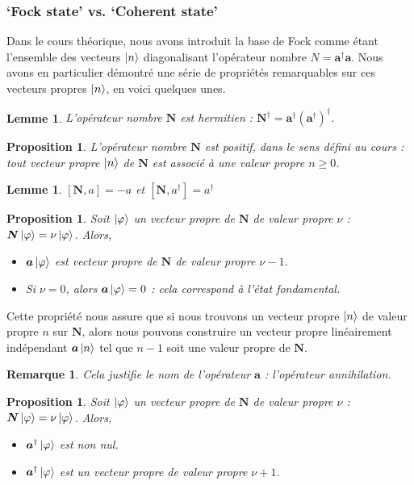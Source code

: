 \documentclass[11pt,oneside,a4paper]{article}
\newtheorem{lemma}[theorem]{Lemme}
\newtheorem{property}[theorem]{Proposition}
\newtheorem{remark}[theorem]{Remarque}
\begin{document}
\subsubsection{`Fock state' vs. `Coherent state'}

Dans le cours théorique, nous avons introduit la base de Fock comme étant l'ensemble des vecteurs $\ket{n}$ diagonalisant l'opérateur nombre $N=\bm{a}^\dagger \bm{a}$. Nous avons en particulier démontré une série de propriétés remarquables sur ces vecteurs propres $\ket{n}$, en voici quelques unes.

\begin{lemma}
  L'opérateur nombre $\bm{N}$ est hermitien : $\bm{N}^\dagger = \bm{a}^\dagger \left(\bm{a}^\dagger\right)^\dagger$.
\end{lemma}

\begin{property}
  L'opérateur nombre $\bm{N}$ est positif, dans le sens défini au cours : tout vecteur propre $\ket{n}$ de $\bm{N}$ est associé à une valeur propre $n\geq 0$.
\end{property}
\begin{lemma}
  $[\bm{N},a]=-a$ et $[\bm{N},a^\dagger] = a^\dagger$
\end{lemma}
\begin{property}
  \label{Vp destruction}
  Soit $\ket{\varphi}$ un vecteur propre de $\bm{N}$ de valeur propre $\nu$ : $\bm{N}\ket{\varphi} = \nu\ket{\varphi}$. Alors,
  \begin{itemize}
      \item $\bm{a}\ket{\varphi}$ est vecteur propre de $\bm{N}$ de valeur propre $\nu-1$.
      \item Si $\nu = 0$, alors $\bm{a}\ket{\varphi} = 0$ : cela correspond à l'état fondamental.
  \end{itemize}
\end{property}
Cette propriété nous assure que si nous trouvons un vecteur propre $\ket{n}$ de valeur propre $n$ sur $\bm{N}$, alors nous pouvons construire un vecteur propre linéairement indépendant $\bm{a}\ket{n}$ tel que $n-1$ soit une valeur propre de $\bm{N}$.
\begin{remark}
  Cela justifie le nom de l'opérateur $\bm{a}$ : l'opérateur annihilation.
\end{remark}
\begin{property}
  Soit $\ket{\varphi}$ un vecteur propre de $\bm{N}$ de valeur propre $\nu$ : $\bm{N}\ket{\varphi} = \nu\ket{\varphi}$. Alors,
  \begin{itemize}
      \item $\bm{a}^\dagger\ket{\varphi}$ est non nul.
      \item $\bm{a}^\dagger\ket{\varphi}$ est un vecteur propre de valeur propre $\nu+1$.
  \end{itemize}
\end{property}
\end{document}
